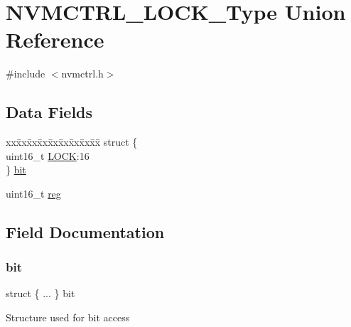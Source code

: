 \hypertarget{union_n_v_m_c_t_r_l___l_o_c_k___type}{}\section{N\+V\+M\+C\+T\+R\+L\+\_\+\+L\+O\+C\+K\+\_\+\+Type Union Reference}
\label{union_n_v_m_c_t_r_l___l_o_c_k___type}


{\ttfamily \#include $<$nvmctrl.\+h$>$}

\subsection*{Data Fields}
\begin{DoxyCompactItemize}
\item 
\begin{tabbing}
xx\=xx\=xx\=xx\=xx\=xx\=xx\=xx\=xx\=\kill
struct \{\\
\>uint16\_t \mbox{\hyperlink{union_n_v_m_c_t_r_l___l_o_c_k___type_a509e421bf1126783f92dc74dced65b5b}{LOCK}}:16\\
\} \mbox{\hyperlink{union_n_v_m_c_t_r_l___l_o_c_k___type_a143626dbe973cc77cef957b4abd7f2d5}{bit}}\\

\end{tabbing}\item 
uint16\+\_\+t \mbox{\hyperlink{union_n_v_m_c_t_r_l___l_o_c_k___type_a11760f5020019f4aa8cb02e694f7cc44}{reg}}
\end{DoxyCompactItemize}


\subsection{Field Documentation}
\mbox{\label{union_n_v_m_c_t_r_l___l_o_c_k___type_a143626dbe973cc77cef957b4abd7f2d5}} 
\subsubsection{\texorpdfstring{bit}{bit}}
{\footnotesize\ttfamily struct \{ ... \}   bit}

Structure used for bit access \mbox{\label{union_n_v_m_c_t_r_l___l_o_c_k___type_a509e421bf1126783f92dc74dced65b5b}} 
